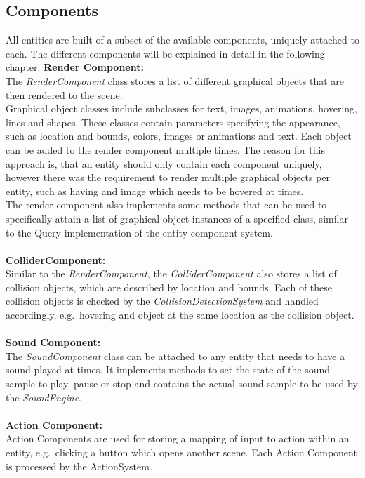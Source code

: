 \subsection{Components}\label{subsec:components}
All entities are built of a subset of the available components, uniquely attached to each.
The different components will be explained in detail in the following chapter.
\textbf{Render Component:} \\
The \textit{RenderComponent} class stores a list of different graphical objects that are then rendered to the scene.\\
Graphical object classes include subclasses for text, images, animations, hovering, lines and shapes.
These classes contain parameters specifying the appearance, such as location and bounds, colors, images or animations and text.
Each object can be added to the render component multiple times.
The reason for this approach is, that an entity should only contain each component uniquely, however there was the requirement to render multiple graphical
objects per entity, such as having and image which needs to be hovered at times. \\
The render component also implements some methods that can be used to specifically attain a list of graphical object instances of a specified class, similar to the Query
implementation of the entity component system.\\ \\

\textbf{ColliderComponent:} \\
Similar to the \textit{RenderComponent}, the \textit{ColliderComponent} also stores a list of collision objects, which are described by location and bounds.
Each of these collision objects is checked by the \textit{CollisionDetectionSystem} and handled accordingly, e.g.\
hovering and object at the same location as the collision object. \\ \\

\textbf{Sound Component:} \\
The \textit{SoundComponent} class can be attached to any entity that needs to have a sound played at times.
It implements methods to set the state of the sound sample to play, pause or stop and contains the actual sound sample to be used by the \textit{SoundEngine}. \\ \\

\textbf{Action Component:} \\
Action Components are used for storing a mapping of input to action within an entity, e.g.\ clicking a button which opens another scene.
Each Action Component is processed by the ActionSystem. \\ \\

